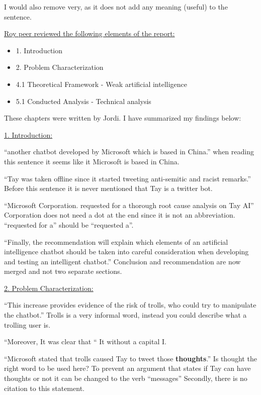 I would also remove very, as it does not add any meaning (useful) to the sentence.

\newpage

\underline{Roy peer reviewed the following elements of the report:}

\begin{itemize}
    \item 1. Introduction
    \item 2. Problem Characterization
    \item 4.1 Theoretical Framework - Weak artificial intelligence
    \item 5.1 Conducted Analysis - Technical analysis
\end{itemize}

These chapters were written by Jordi. I have summarized my findings below:

\underline{1. Introduction:}

“another chatbot developed by Microsoft which is based in China.” when reading this sentence it seems like it Microsoft is based in China.

“Tay was taken offline since it started tweeting anti-semitic and racist remarks.” Before this sentence it is never mentioned that Tay is a twitter bot.

“Microsoft Corporation. requested for a thorough root cause analysis on Tay AI” Corporation does not need a dot at the end since it is not an abbreviation.
“requested for a” should be “requested a”.

“Finally, the recommendation will explain which elements of an artificial intelligence chatbot should be taken into careful consideration when developing and testing an intelligent chatbot.” Conclusion and recommendation are now merged and not two separate sections.

\underline{2. Problem Characterization:}

“This increase provides evidence of the risk of trolls, who could try to manipulate the chatbot.” Trolls is a very informal word, instead you could describe what a trolling user is.

“Moreover, It was clear that “ It without a capital I.

“Microsoft stated that trolls caused Tay to tweet those \textbf{thoughts}.” Is thought the right word to be used here? To prevent an argument that states if Tay can have thoughts or not it can be changed to the verb “messages”
Secondly, there is no citation to this statement.

